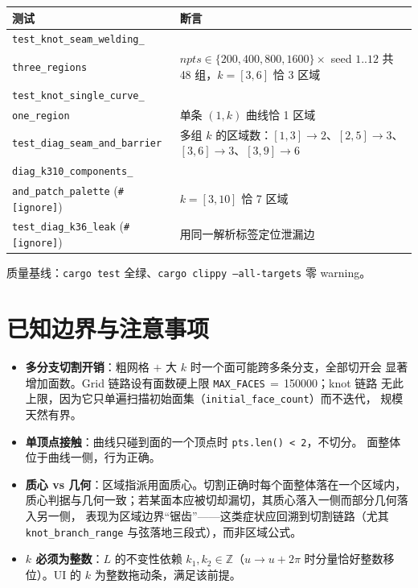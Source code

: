 \documentclass{article}
\begin{document}
\begin{center}
\begin{tabular}{@{}p{5.4cm}p{8.4cm}@{}}
\hline
\textbf{测试} & \textbf{断言} \\
\hline
\texttt{test\_knot\_seam\_welding\_}\\\texttt{three\_regions} & $npts\in\{200,400,800,1600\}\times$ seed $1..12$ 共 48 组，$k=[3,6]$ 恰 3 区域 \\
\texttt{test\_knot\_single\_curve\_}\\\texttt{one\_region} & 单条 $(1,k)$ 曲线恰 1 区域 \\
\texttt{test\_diag\_seam\_and\_barrier} & 多组 $k$ 的区域数：$[1,3]\to2$、$[2,5]\to3$、$[3,6]\to3$、$[3,9]\to6$ \\
\texttt{diag\_k310\_components\_}\\\texttt{and\_patch\_palette} (\texttt{\#[ignore]}) & $k=[3,10]$ 恰 7 区域 \\
\texttt{test\_diag\_k36\_leak} (\texttt{\#[ignore]}) & 用同一解析标签定位泄漏边 \\
\hline
\end{tabular}
\end{center}

质量基线：\texttt{cargo test} 全绿、\texttt{cargo clippy --all-targets} 零 warning。

\section{已知边界与注意事项}

\begin{itemize}
\item \textbf{多分支切割开销}：粗网格 $+$ 大 $k$ 时一个面可能跨多条分支，全部切开会
  显著增加面数。Grid 链路设有面数硬上限 \texttt{MAX\_FACES}$\,=\,$150000；knot 链路
  无此上限，因为它只单遍扫描初始面集（\texttt{initial\_face\_count}）而不迭代，
  规模天然有界。
\item \textbf{单顶点接触}：曲线只碰到面的一个顶点时 \texttt{pts.len() < 2}，不切分。
  面整体位于曲线一侧，行为正确。
\item \textbf{质心 vs 几何}：区域指派用面质心。切割正确时每个面整体落在一个区域内，
  质心判据与几何一致；若某面本应被切却漏切，其质心落入一侧而部分几何落入另一侧，
  表现为区域边界“锯齿”——这类症状应回溯到切割链路（尤其
  \texttt{knot\_branch\_range} 与弦落地三段式），而非区域公式。
\item \textbf{$k$ 必须为整数}：$L$ 的不变性依赖 $k_1,k_2\in\mathbb{Z}$（$u\to u+2\pi$
  时分量恰好整数移位）。UI 的 $k$ 为整数拖动条，满足该前提。
\end{itemize}
\end{document}
